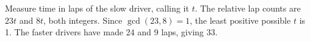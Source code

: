 Measure time in laps of the slow driver, calling it $t$. The relative lap counts are $23t$ and $8t$, both integers. Since $\gcd(23,8)=1$, the least positive possible $t$ is 1. The faster drivers have made 24 and 9 laps, giving $\boxed{33}$.
